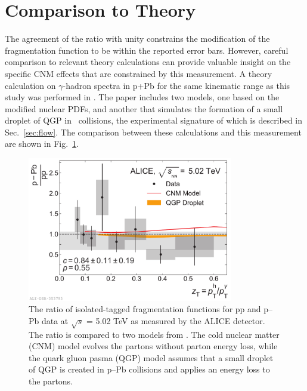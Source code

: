 \section{Comparison to Theory}
The agreement of the ratio with unity constrains the modification of the fragmentation function to be within the reported error bars. However, careful comparison to relevant theory calculations can provide valuable insight on the specific CNM effects that are constrained by this measurement. A theory calculation on $\gamma$-hadron spectra in p+Pb for the same kinematic range as this study was performed in \cite{Xie2021}. The paper includes two models, one based on the modified nuclear PDFs, and another that simulates the formation of a small droplet of QGP in \pPb~collisions, the experimental signature of which is described in Sec.~\ref{sec:flow}. The comparison between these calculations and this measurement are shown in Fig.~\ref{fig:FF_model}.
\begin{figure}[htpb]
  \centering
  \includegraphics[width=0.8\textwidth]{FF_Model_Comparisons_Ratio.pdf}
  \caption{The ratio of isolated-tagged fragmentation functions for pp and p–Pb data at $\sqrt{s}$ = 5.02 TeV as measured by the ALICE detector.  The ratio is compared to two models from \cite{Xie2021}. The cold nuclear matter (CNM) model evolves the partons without parton energy loss, while the quark gluon pasma (QGP) model assumes that a small droplet of QGP is created in p–Pb collisions and applies an energy loss to the partons.}
  \label{fig:FF_model}
\end{figure}

